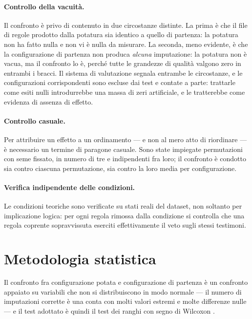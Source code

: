 \paragraph{Controllo della vacuità.} Il confronto è privo di contenuto in due circostanze
distinte. La prima è che il file di regole prodotto dalla potatura sia identico a quello di
partenza: la potatura non ha fatto nulla e non vi è nulla da misurare. La seconda, meno evidente,
è che la configurazione di partenza non produca \emph{alcuna} imputazione: la potatura non è
vacua, ma il confronto lo è, perché tutte le grandezze di qualità valgono zero in entrambi i
bracci. Il sistema di valutazione segnala entrambe le circostanze, e le configurazioni
corrispondenti sono escluse dai test e contate a parte: trattarle come esiti nulli introdurrebbe
una massa di zeri artificiale, e le tratterebbe come evidenza di assenza di effetto.

\paragraph{Controllo casuale.} Per attribuire un effetto a un ordinamento --- e non al mero atto
di riordinare --- è necessario un termine di paragone casuale. Sono state impiegate permutazioni
con seme fissato, in numero di tre e indipendenti fra loro; il confronto è condotto sia contro
ciascuna permutazione, sia contro la loro media per configurazione.

\paragraph{Verifica indipendente delle condizioni.} Le condizioni teoriche sono verificate su
stati reali del dataset, non soltanto per implicazione logica: per ogni regola rimossa dalla
condizione \Vtwo{} si controlla che una regola coprente sopravvissuta eserciti effettivamente il
veto sugli stessi testimoni.

\section{Metodologia statistica}\label{sec:statistics}

Il confronto fra configurazione potata e configurazione di partenza è un confronto appaiato su
variabili che non si distribuiscono in modo normale --- il numero di imputazioni corrette è una
conta con molti valori estremi e molte differenze nulle --- e il test adottato è quindi il test
dei ranghi con segno di Wilcoxon \cite{wilcoxon1945individual}.

